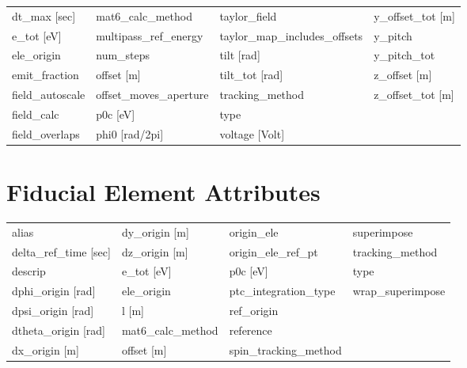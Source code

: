 \begin{tabular}{llll}
dt_max [sec]                     & mat6_calc_method                 & taylor_field                     & y_offset_tot [m]                 \\
e_tot [eV]                       & multipass_ref_energy             & taylor_map_includes_offsets      & y_pitch                          \\
ele_origin                       & num_steps                        & tilt [rad]                       & y_pitch_tot                      \\
emit_fraction                    & offset [m]                       & tilt_tot [rad]                   & z_offset [m]                     \\
field_autoscale                  & offset_moves_aperture            & tracking_method                  & z_offset_tot [m]                 \\
field_calc                       & p0c [eV]                         & type                             &                                  \\
field_overlaps                   & phi0 [rad/2pi]                   & voltage [Volt]                   &                                  \\
 \bottomrule
 \end{tabular}
 \vfill
 
 \section{Fiducial Element Attributes}
 \label{s:list.fiducial}
 
 \begin{tabular}{llll} \toprule
alias                            & dy_origin [m]                    & origin_ele                       & superimpose                      \\
delta_ref_time [sec]             & dz_origin [m]                    & origin_ele_ref_pt                & tracking_method                  \\
descrip                          & e_tot [eV]                       & p0c [eV]                         & type                             \\
dphi_origin [rad]                & ele_origin                       & ptc_integration_type             & wrap_superimpose                 \\
dpsi_origin [rad]                & l [m]                            & ref_origin                       &                                  \\
dtheta_origin [rad]              & mat6_calc_method                 & reference                        &                                  \\
dx_origin [m]                    & offset [m]                       & spin_tracking_method             &                                  \\
 \bottomrule
 \end{tabular}
 \vfill
 
